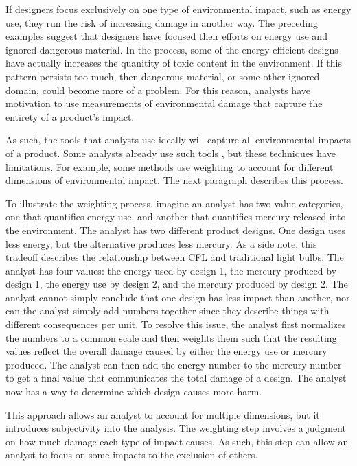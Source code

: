 \documentclass[final,journal,10pt,letterpaper,oneside,twocolumn,compsoc]%
{IEEEtran}
\begin{document}
If designers focus exclusively on one type of environmental impact,
such as energy use, they run the risk of increasing damage in another way. The
preceding examples suggest that designers have focused their efforts on energy
use and ignored dangerous material. In the process, some of the energy-efficient
designs have actually increases the quanitity of toxic content in the
environment. If this pattern persists too much,
then
dangerous material, or some other ignored domain, could become more of a
problem. For this reason, analysts have motivation to use measurements of
environmental damage that capture the entirety of a product's impact.

As such, the tools that analysts use ideally will capture all environmental
impacts of a product. Some analysts already use such tools \cite{triangle}, but
these techniques have limitations. For example, some methods use weighting to
account
for different dimensions of environmental impact. The next paragraph describes
this process.

To illustrate the weighting process, imagine an analyst has two value
categories, one that
quantifies energy use, and another that quantifies mercury released into the
environment. The analyst has two different product designs. One design uses less
energy, but the alternative produces less mercury. As a side note, this
tradeoff describes the relationship between CFL and traditional light bulbs. The
analyst has four values: the energy used by design 1, the mercury produced by
design 1, the energy use by design 2, and the mercury produced by design 2. The
analyst cannot simply conclude that one design has less impact than another, nor
can the analyst simply add numbers together since they describe
things with different consequences per unit. To resolve this issue, the analyst
first normalizes the numbers to a common scale and then weights them such that
the resulting values reflect the overall damage caused by either the energy use
or mercury produced. The analyst can then add the energy number to the mercury
number to get a final value that communicates the total damage of a design. The
analyst now has a way to determine which design causes more harm.

This approach allows an analyst to account for multiple dimensions, but it
introduces subjectivity into the analysis. The weighting step involves a
judgment on how much damage each type of impact causes. As such, this step can
allow an analyst to focus on some impacts to the exclusion of
others.
\end{document}
